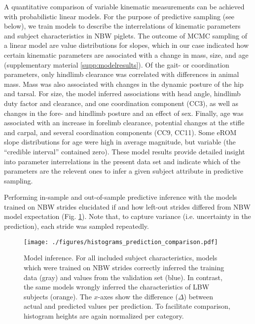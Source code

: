 \bigskip

A quantitative comparison of variable kinematic measurements can be achieved with probabilistic linear models.
For the purpose of predictive sampling (see below), we train models to describe the interrelations of kinematic parameters and subject characteristics in NBW piglets.
The outcome of MCMC sampling of a linear model are value distributions for slopes, which in our case indicated how certain kinematic parameters are associated with a change in mass, size, and age (supplementary material \ref{supp:modelresults}).
Of the gait- or coordination parameters, only hindlimb clearance was correlated with differences in animal mass.
Mass was also associated with changes in the dynamic posture of the hip and tarsal.
For size, the model inferred associations with head angle, hindlimb duty factor and clearance, and one coordination component (CC3), as well as changes in the fore- and hindlimb posture and an effect of sex.
Finally, age was associated with an increase in forelimb clearance, potential changes at the stifle and carpal, and several coordination components (CC9, CC11).
Some eROM slope distributions for age were high in average magnitude, but variable (the ``credible interval'' contained zero).
These model results provide detailed insight into parameter interrelations in the present data set and indicate which of the parameters are the relevent ones to infer a given subject attribute in predictive sampling.



\bigskip

Performing in-sample and out-of-sample predictive inference with the models trained on NBW strides elucidated if and how left-out strides differed from NBW model expectation (Fig. \ref{fig:predictions}).
Note that, to capture variance (i.e. uncertainty in the prediction), each stride was sampled repeatedly.

\begin{figure}[t!]
\centering
\texttt{[image: ./figures/histograms\_prediction\_comparison.pdf]}
\caption{\label{fig:predictions}Model inference. For all included subject characteristics, models which were trained on NBW strides correctly inferred the training data (gray) and values from the validation set (blue). In contrast, the same models wrongly inferred the characteristics of LBW subjects (orange). The \(x\)-axes show the difference (\(\Delta\)) between actual and predicted values per prediction. To facilitate comparison, histogram heights are again normalized per category.}
\end{figure}


